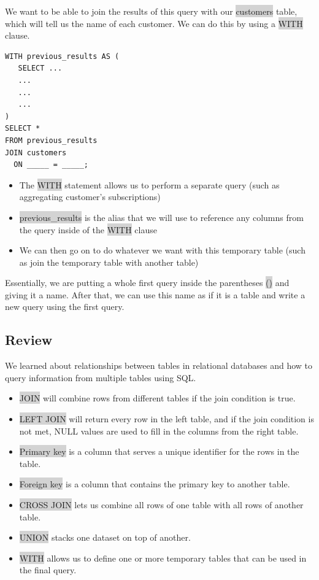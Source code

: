 \documentclass[11pt]{article}
\begin{document}
{{{{{{{We want to be able to join the results of this query with our \colorbox{lightgray}{customers} table, which will tell us the name of each customer. We can do this by using a \colorbox{lightgray}{WITH} clause.
\begin{lstlisting}
WITH previous_results AS (
   SELECT ...
   ...
   ...
   ...
)
SELECT *
FROM previous_results
JOIN customers
  ON _____ = _____;
\end{lstlisting}
\begin{itemize}[leftmargin = *]
\item The \colorbox{lightgray}{WITH} statement allows us to perform a separate query (such as aggregating customer’s subscriptions)
\item \colorbox{lightgray}{previous\_results} is the alias that we will use to reference any columns from the query inside of the \colorbox{lightgray}{WITH} clause
\item We can then go on to do whatever we want with this temporary table (such as join the temporary table with another table)
\end{itemize}
Essentially, we are putting a whole first query inside the parentheses \colorbox{lightgray}{()} and giving it a name. After that, we can use this name as if it is a table and write a new query using the first query.

\subsection{Review}
We learned about relationships between tables in relational databases and how to query information from multiple tables using SQL.
\begin{itemize}
\item \colorbox{lightgray}{JOIN} will combine rows from different tables if the join condition is true.
\item \colorbox{lightgray}{LEFT JOIN} will return every row in the left table, and if the join condition is not met, NULL values are used to fill in the columns from the right table.
\item \colorbox{lightgray}{Primary key} is a column that serves a unique identifier for the rows in the table.
\item \colorbox{lightgray}{Foreign key} is a column that contains the primary key to another table.
\item \colorbox{lightgray}{CROSS JOIN} lets us combine all rows of one table with all rows of another table.
\item \colorbox{lightgray}{UNION} stacks one dataset on top of another.
\item \colorbox{lightgray}{WITH} allows us to define one or more temporary tables that can be used in the final query.
\end{itemize}

}}}}}}}
\end{document}
